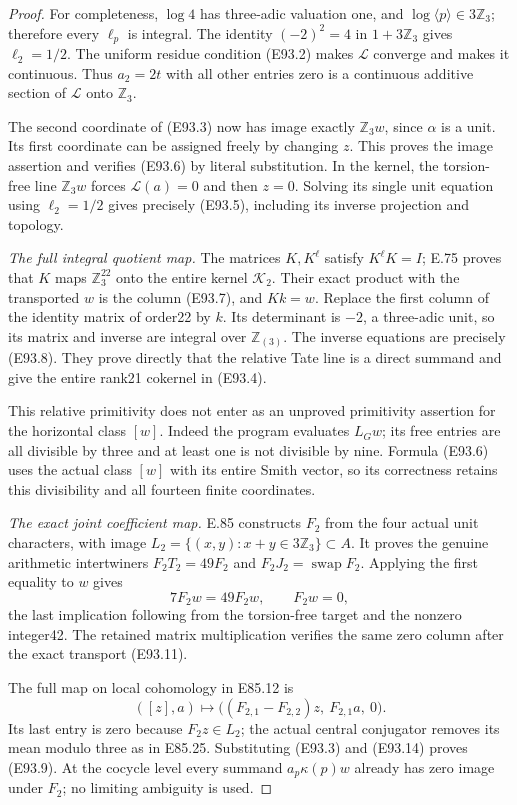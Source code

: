 \begin{proof}
For completeness, $\log4$ has three-adic valuation one,
and $\log\langle p\rangle\in3\mathbb Z_3$; therefore
every $\ell_p$ is integral. The identity $(-2)^2=4$ in
$1+3\mathbb Z_3$ gives $\ell_2=1/2$. The uniform residue
condition (E93.2) makes $\mathcal L$ converge and makes it
continuous. Thus $a_2=2t$ with all other entries zero is a
continuous additive section of $\mathcal L$ onto
$\mathbb Z_3$.

The second coordinate of (E93.3) now has image exactly
$\mathbb Z_3w$, since $\alpha$ is a unit. Its first
coordinate can be assigned freely by changing $z$.
This proves the image assertion and verifies (E93.6)
by literal substitution. In the kernel, the torsion-free
line $\mathbb Z_3w$ forces $\mathcal L(a)=0$ and then
$z=0$. Solving its single unit equation using
$\ell_2=1/2$ gives precisely (E93.5), including its
inverse projection and topology.

\emph{The full integral quotient map.}
The matrices $K,K^{\ell}$ satisfy $K^{\ell}K=I$;
E.75 proves that $K$ maps $\mathbb Z_3^{22}$ onto
the entire kernel $\mathcal K_2$. Their exact product
with the transported $w$ is the column (E93.7), and
$Kk=w$. Replace the first column of the identity
matrix of order22 by $k$. Its determinant is $-2$,
a three-adic unit, so its matrix and inverse are
integral over $\mathbb Z_{(3)}$. The inverse equations
are precisely (E93.8). They prove directly that the
relative Tate line is a direct summand and give the
entire rank21 cokernel in (E93.4).

This relative primitivity does not enter as an
unproved primitivity assertion for the horizontal
class $[w]$. Indeed the program evaluates $L_Gw$;
its free entries are all divisible by three and
at least one is not divisible by nine. Formula
(E93.6) uses the actual class $[w]$ with its entire
Smith vector, so its correctness retains this
divisibility and all fourteen finite coordinates.

\emph{The exact joint coefficient map.}
E.85 constructs $F_2$ from the four actual unit
characters, with image
$L_2=\{(x,y):x+y\in3\mathbb Z_3\}\subset A$.
It proves the genuine arithmetic intertwiners
$F_2T_2=49F_2$ and $F_2J_2=\operatorname{swap}F_2$.
Applying the first equality to $w$ gives
\[
             7F_2w=49F_2w,\qquad F_2w=0,
 \tag{E93.14}
\]
the last implication following from the torsion-free
target and the nonzero integer42. The retained
matrix multiplication verifies the same zero
column after the exact transport (E93.11).

The full map on local cohomology in E85.12 is
\[
 ([z],a)\longmapsto
       \bigl((F_{2,1}-F_{2,2})z,\ F_{2,1}a,\ 0\bigr).
 \tag{E93.15}
\]
Its last entry is zero because $F_2z\in L_2$;
the actual central conjugator removes its mean
modulo three as in E85.25. Substituting (E93.3)
and (E93.14) proves (E93.9). At the cocycle level
every summand $a_p\kappa(p)w$ already has zero
image under $F_2$; no limiting ambiguity is used.


\end{proof}
